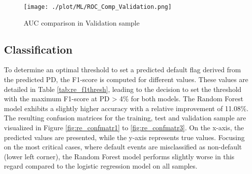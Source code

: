 \begin{figure}[H]
	\centering
	\texttt{[image: ./plot/ML/ROC\_Comp\_Validation.png]}
    \caption{AUC comparison in Validation sample}
    \label{fig:re_roc2}
\end{figure}

\subsection{Classification}
To determine an optimal threshold to set a predicted default flag derived from the predicted PD, the F1-score is computed for different values. These values are detailed in Table \ref{tab:re_f1thresh}, leading to the decision to set the threshold with the maximum F1-score at PD > 4\% for both models. The Random Forest model exhibits a slightly higher accuracy with a relative improvement of 11.08\%. The resulting confusion matrices for the training, test and validation sample are visualized in Figure \ref{fig:re_confmatr1} to \ref{fig:re_confmatr3}. On the x-axis, the predicted values are presented, while the y-axis represents true values. Focusing on the most critical cases, where default events are misclassified as non-default (lower left corner), the Random Forest model performs slightly worse in this regard compared to the logistic regression model on all samples.

